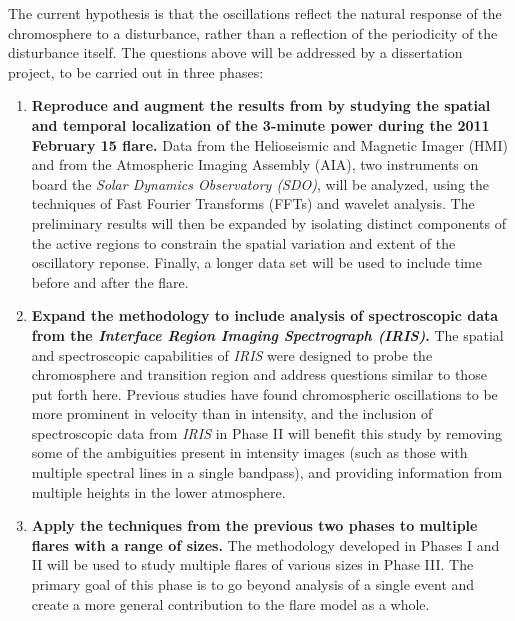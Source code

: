 The current hypothesis is that the oscillations reflect the natural
response of the chromosphere to a disturbance, rather than a reflection of
the periodicity of the disturbance itself.
The questions above will be addressed by a dissertation project,
to be carried out in three phases:
\begin{enumerate}%
    \item \textbf{Reproduce and augment the results from \cite{Milligan2017} by
        studying the spatial and temporal localization of the 3-minute power
        during the 2011 February 15 flare.}
        Data from the Helioseismic and Magnetic Imager (HMI) and from the
        Atmospheric Imaging Assembly (AIA), two instruments on board the
        \textit{Solar Dynamics Observatory (SDO)},
        will be analyzed, using the techniques of Fast Fourier Transforms (FFTs)
        and wavelet analysis.
        The preliminary results will then be expanded by
        isolating distinct components of the active regions to constrain the
        spatial variation and extent of the oscillatory reponse. Finally, a
        longer data set will be used to include time before and after the
        flare.
    \item \textbf{Expand the methodology to include analysis of spectroscopic data from
        the \textit{Interface Region Imaging Spectrograph (IRIS)}.}
        The spatial
        and spectroscopic capabilities of \textit{IRIS} were designed to probe
        the chromosphere and transition region and address questions similar to
        those put forth here. Previous studies have found chromospheric
        oscillations to be more prominent in velocity than in intensity, and
        the inclusion of spectroscopic data from \textit{IRIS} in Phase II will
        benefit this study by removing some of the ambiguities present in
        intensity images (such as those with multiple spectral lines in a
        single bandpass), and providing information from multiple heights in
        the lower atmosphere.
    \item \textbf{Apply the techniques from the previous two phases to multiple flares
        with a range of sizes.}
        The methodology developed in Phases I and II
        will be used to study multiple flares of various sizes in Phase III.
        The primary goal of this phase is to go beyond analysis of a single
        event and create a more general contribution to the flare model as a
        whole.
\end{enumerate}

